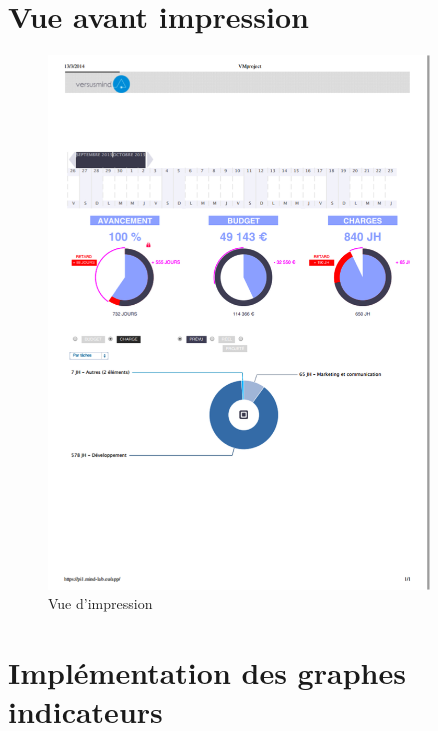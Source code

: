 \documentclass[12pt]{report}
\begin{document}
\begin{appendices}
	\chapter{Vue avant impression}
	
	\begin{figure}[H]
	\centering
	\includegraphics[width=0.9\textwidth]{pictures/matthieu/m_imprimable.png}
	\caption{Vue d'impression}
	\label{m7}
\end{figure}

	\chapter{Implémentation des graphes indicateurs}
	

\end{appendices}
\end{document}
